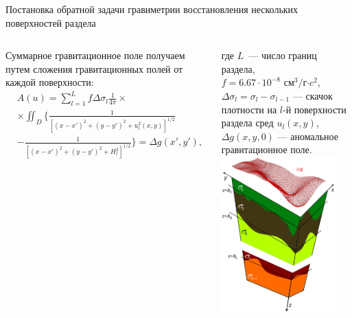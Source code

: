 \documentclass[10pt,pdf, mathserif, hyperref={unicode}]{beamer}
\begin{document}
\begin{frame}{Постановка обратной задачи гравиметрии восстановления нескольких поверхностей раздела}
	\begin{columns}
	Суммарное гравитационное поле получаем путем сложения гравитационных полей от каждой поверхности:
	\begin{equation*}
	\begin{aligned}
	& A(u)=\sum_{l=1}^{L}f\Delta\sigma_l\frac{1}{4\pi}\times \\
&\times\iint_D\bigg\{\frac{1}{[(x-x')^2+(y-y')^2+u_l^2(x,y)]^{1/2}} \\
	&-\frac{1}{[(x-x')^2+(y-y')^2+H_l^2]^{1/2}}\bigg\}=\Delta g(x',y'),
	\end{aligned}
	\end{equation*}

	где $L$~--- число границ раздела, \\ 
	$f=6.67\cdot10^{-8}$ см$^3/$г$\cdot c^2$, $\Delta\sigma_l=\sigma_l-\sigma_{l-1}$ --- скачок плотности на $l$-й поверхности раздела сред $u_l(x,y)$, $\Delta g(x,y,0)$ --- аномальное гравитационное поле.
		\centering
		\includegraphics[height=6.0cm]{whitegrav.png}
		\label{fig:multlayer}
\end{columns}

\end{frame}

\end{document}
